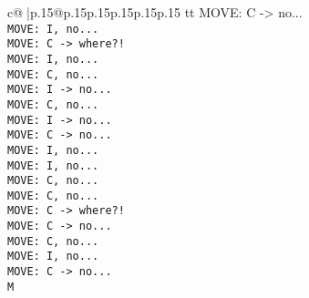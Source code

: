 \documentclass{article}
\begin{document}
{\begin{supertabular}{c@{$\;$}|p{.15\linewidth}@{}p{.15\linewidth}p{.15\linewidth}p{.15\linewidth}p{.15\linewidth}p{.15\linewidth}}
{{{tt  MOVE: C -> no...\\ \tt  MOVE: I, no...\\ \tt  MOVE: C -> where?!\\ \tt  MOVE: I, no...\\ \tt  MOVE: C, no...\\ \tt  MOVE: I -> no...\\ \tt  MOVE: C, no...\\ \tt  MOVE: I -> no...\\ \tt  MOVE: C -> no...\\ \tt  MOVE: I, no...\\ \tt  MOVE: I, no...\\ \tt  MOVE: C, no...\\ \tt  MOVE: C, no...\\ \tt  MOVE: C -> where?!\\ \tt  MOVE: C -> no...\\ \tt  MOVE: C, no...\\ \tt  MOVE: I, no...\\ \tt  MOVE: C -> no...\\ \tt  M}}}
\end{supertabular}}
\end{document}
